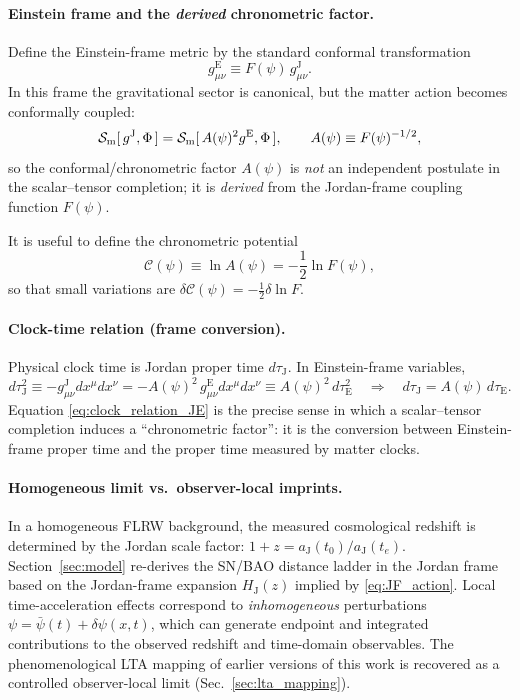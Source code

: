 \documentclass[10pt]{article}
\newcommand{\gJ}{g^{\mathrm{J}}}        %
\newcommand{\gE}{g^{\mathrm{E}}}        %
\newcommand{\aJ}{a_{\mathrm{J}}}
\newcommand{\HJ}{H_{\mathrm{J}}}
\newcommand{\Fpsi}{F(\psi)}
\newcommand{\Apsi}{A(\psi)}
\newcommand{\Cpsi}{\mathcal{C}(\psi)} %
\begin{document}
\paragraph{Einstein frame and the \emph{derived} chronometric factor.}
Define the Einstein-frame metric by the standard conformal transformation
\begin{equation}
\gE_{\mu\nu} \equiv \Fpsi\, \gJ_{\mu\nu}.
\label{eq:conformal_J_to_E}
\end{equation}
In this frame the gravitational sector is canonical, but the matter action becomes conformally
coupled:
\begin{equation}
\mathcal{S}_{\rm m}[\,\gJ,\Phi\,]
=
\mathcal{S}_{\rm m}[\,\Apsi^2 \gE,\Phi\,],
\qquad
\Apsi \equiv \Fpsi^{-1/2},
\label{eq:A_derived}
\end{equation}
so the conformal/chronometric factor $\Apsi$ is \emph{not} an independent postulate in the scalar--tensor
completion; it is \emph{derived} from the Jordan-frame coupling function $F(\psi)$.

It is useful to define the chronometric potential
\begin{equation}
\Cpsi \equiv \ln \Apsi = -\frac{1}{2}\ln \Fpsi,
\label{eq:C_def}
\end{equation}
so that small variations are $\delta \Cpsi = -\frac{1}{2}\delta\ln F$.

\paragraph{Clock-time relation (frame conversion).}
Physical clock time is Jordan proper time $d\tau_{\mathrm{J}}$.
In Einstein-frame variables,
\begin{equation}
d\tau_{\mathrm{J}}^2
\equiv
-\gJ_{\mu\nu}dx^\mu dx^\nu
=
-\Apsi^{2}\,\gE_{\mu\nu}dx^\mu dx^\nu
\equiv
\Apsi^{2}\,d\tau_{\mathrm{E}}^2
\quad\Rightarrow\quad
d\tau_{\mathrm{J}} = \Apsi\, d\tau_{\mathrm{E}}.
\label{eq:clock_relation_JE}
\end{equation}
Equation \eqref{eq:clock_relation_JE} is the precise sense in which a scalar--tensor completion
induces a ``chronometric factor'': it is the conversion between Einstein-frame proper time and the
proper time measured by matter clocks.

\paragraph{Homogeneous limit vs.\ observer-local imprints.}
In a homogeneous FLRW background, the measured cosmological redshift is determined by the Jordan
scale factor: $1+z = \aJ(t_0)/\aJ(t_e)$.
Section~\ref{sec:model} re-derives the SN/BAO distance ladder in the Jordan frame based on the
Jordan-frame expansion $\HJ(z)$ implied by \eqref{eq:JF_action}. Local time-acceleration effects
correspond to \emph{inhomogeneous} perturbations $\psi=\bar\psi(t)+\delta\psi(x,t)$, which can generate
endpoint and integrated contributions to the observed redshift and time-domain observables. The
phenomenological LTA mapping of earlier versions of this work is recovered as a controlled
observer-local limit (Sec.~\ref{sec:lta_mapping}).
\end{document}
